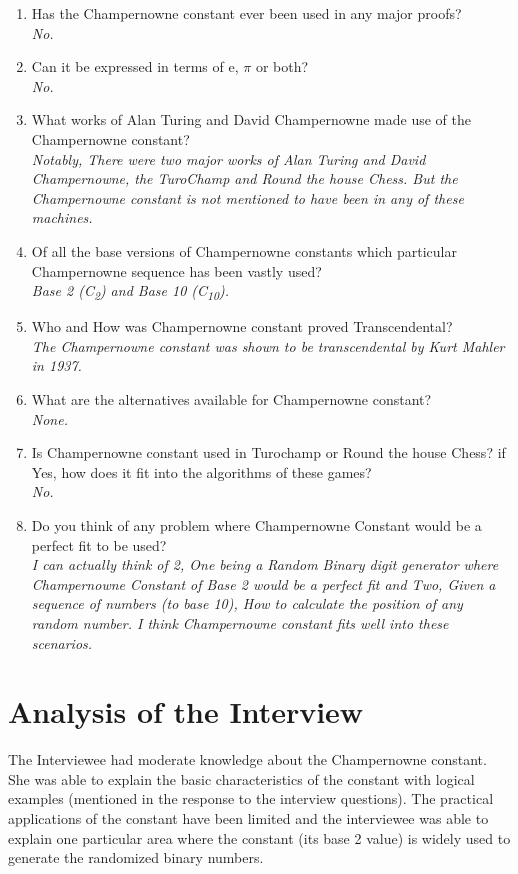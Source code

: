 \documentclass[12pt, a4paper]{report}
\begin{document}
\begin{enumerate}
	\item Has the Champernowne constant ever been used in any major proofs? 
	\\ {\it No.}
	\item Can it be expressed in terms of e,  \( \pi \) or both? 
	\\ {\it No.}
	\item What works of Alan Turing and David Champernowne made use of the Champernowne constant?
	\\ {\it Notably, There were two major works of Alan Turing and David Champernowne, the TuroChamp and Round the house Chess. But the Champernowne constant is not mentioned to have been in any of these machines.}
	\item Of all the base versions of Champernowne constants which particular Champernowne sequence has been vastly used?
	\\{\it Base 2 (C\textsubscript{2}) and Base 10 (C\textsubscript{10}).}
	\item Who and How was Champernowne constant proved Transcendental? 
	\\ {\it The Champernowne constant was shown to be transcendental by Kurt Mahler in 1937.}
	\item What are the alternatives available for Champernowne constant?
	\\ {\it None.}
	\item Is Champernowne constant used in Turochamp or Round the house Chess? if Yes, how does it fit into the algorithms of these games?
	\\ {\it No. }
	\item Do you think of any problem where Champernowne Constant would be a perfect fit to be used?
	\\ {\it I can actually think of 2, One being a Random Binary digit generator where Champernowne Constant of Base 2 would be a perfect fit and Two, Given a sequence of numbers (to base 10), How to calculate the position of any random number. I think Champernowne constant fits well into these scenarios. }
\end{enumerate}
\section{Analysis of the Interview}
\quad The Interviewee had moderate knowledge about the Champernowne constant. She was able to explain the basic characteristics of the constant with logical examples (mentioned in the response to the interview questions). The practical applications of the constant have been limited and the interviewee was able to explain one particular area where the constant (its base 2 value) is widely used to generate the randomized binary numbers.
\end{document}

